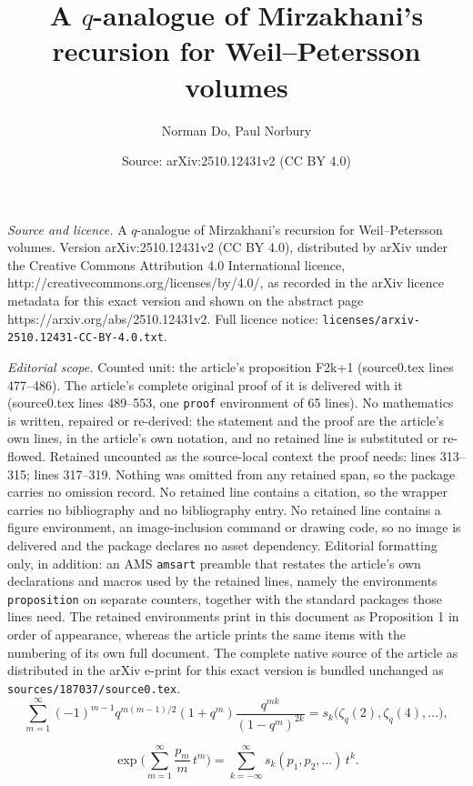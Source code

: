 \documentclass[10pt,a4paper]{amsart}
\title{A $q$-analogue of Mirzakhani's recursion for Weil--Petersson volumes}
\author{Norman Do, Paul Norbury}
\date{Source: arXiv:2510.12431v2 (CC BY 4.0)}
\begin{document}
\maketitle

\noindent\emph{Source and licence.} A $q$-analogue of Mirzakhani's recursion for Weil--Petersson volumes. Version arXiv:2510.12431v2 (CC BY 4.0), distributed by arXiv under the Creative Commons Attribution 4.0 International licence, http://creativecommons.org/licenses/by/4.0/, as recorded in the arXiv licence metadata for this exact version and shown on the abstract page https://arxiv.org/abs/2510.12431v2. Full licence notice: \texttt{licenses/arxiv-2510.12431-CC-BY-4.0.txt}.\par\smallskip

\noindent\textit{Editorial scope.} Counted unit: the article's proposition F2k+1 (source0.tex lines 477--486). The article's complete original proof of it is delivered with it (source0.tex lines 489--553, one \texttt{proof} environment of 65 lines). No mathematics is written, repaired or re-derived: the statement and the proof are the article's own lines, in the article's own notation, and no retained line is substituted or re-flowed.  Retained uncounted as the source-local context the proof needs: lines 313--315; lines 317--319.  Nothing was omitted from any retained span, so the package carries no omission record.  No retained line contains a citation, so the wrapper carries no bibliography and no bibliography entry.  No retained line contains a figure environment, an image-inclusion command or drawing code, so no image is delivered and the package declares no asset dependency.  Editorial formatting only, in addition: an AMS \texttt{amsart} preamble that restates the article's own declarations and macros used by the retained lines, namely the environments \texttt{proposition} on separate counters, together with the standard packages those lines need.  The retained environments print in this document as Proposition 1 in order of appearance, whereas the article prints the same items with the numbering of its own full document.  The complete native source of the article as distributed in the arXiv e-print for this exact version is bundled unchanged as \texttt{sources/187037/source0.tex}.
\begin{equation} \label{qident}
\sum_{m=1}^\infty(-1)^{m-1}q^{m(m-1)/2}(1+q^m)\frac{q^{mk}}{(1-q^m)^{2k}} = s_k \big( \zeta_q(2), \zeta_q(4), \ldots \big),
\end{equation}

\begin{equation} \label{eq:sk}
\exp \bigg(\sum_{m=1}^\infty \frac{p_m}{m} \, t^m \bigg) = \sum_{k=-\infty}^\infty s_k(p_1, p_2, \ldots) \, t^k.
\end{equation}
\end{document}
